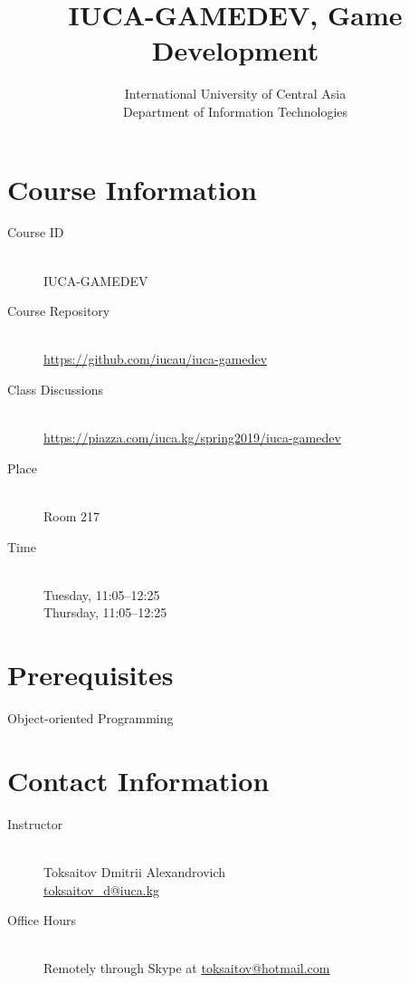 \documentclass[12pt,a4paper,oneside]{article}
\begin{document}
    \title{IUCA-GAMEDEV, Game Development}
    \author{
        International University of Central Asia\\
        Department of Information Technologies
    }
    \date{}
    \maketitle

    \section{Course Information}

        \begin{description}
            \item[Course ID]\hfill\\
                IUCA-GAMEDEV
            \item[Course Repository]\hfill\\
                \url{https://github.com/iucau/iuca-gamedev}
            \item[Class Discussions]\hfill\\
                \url{https://piazza.com/iuca.kg/spring2019/iuca-gamedev}
            \item[Place]\hfill\\
                Room 217
            \item[Time]\hfill\\
                Tuesday, 11:05--12:25\\
                Thursday, 11:05--12:25
        \end{description}

    \section{Prerequisites}

        Object-oriented Programming

    \section{Contact Information}

        \begin{description}
            \item[Instructor]\hfill\\
                Toksaitov Dmitrii Alexandrovich\\
                \href{mailto:toksaitov_d@iuca.kg}{toksaitov\_d@iuca.kg}
            \item[Office Hours]\hfill\\
                Remotely through Skype at \href{mailto:toksaitov_d@iuca.kg}{toksaitov@hotmail.com}
        \end{description}
\end{document}
